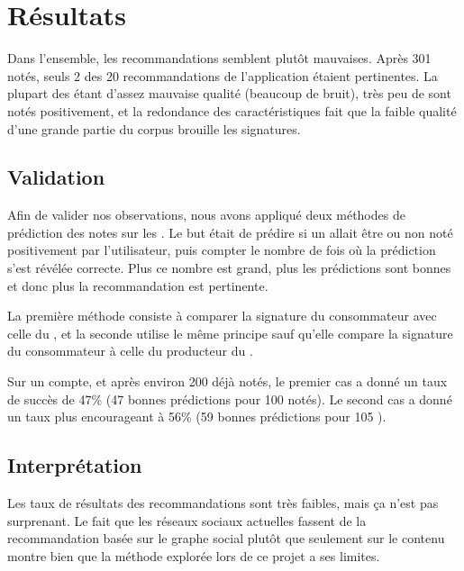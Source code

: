 
\section{Résultats}

Dans l’ensemble, les recommandations semblent plutôt mauvaises. Après 301
\tweets{} notés, seuls 2 des 20 recommandations de l’application étaient
pertinentes. La plupart des \tweets{} étant d’assez mauvaise qualité (beaucoup
de bruit), très peu de \tweets{} sont notés positivement, et la redondance des
caractéristiques fait que la faible qualité d’une grande partie du corpus
brouille les signatures.

\subsection{Validation}

Afin de valider nos observations, nous avons appliqué deux méthodes de
prédiction des notes sur les \tweets{}. Le but était de prédire si un \tweet{}
allait être ou non noté positivement par l’utilisateur, puis compter le nombre
de fois où la prédiction s’est révélée correcte. Plus ce nombre est grand, plus
les prédictions sont bonnes et donc plus la recommandation est pertinente.

La première méthode consiste à comparer la signature du consommateur avec celle
du \tweet{}, et la seconde utilise le même principe sauf qu’elle compare la
signature du consommateur à celle du producteur du \tweet{}.

Sur un compte, et après environ 200 \tweets{} déjà notés, le premier cas a
donné un taux de succès de 47\% (47 bonnes prédictions pour 100 \tweets{}
notés). Le second cas a donné un taux plus encourageant à 56\% (59 bonnes
prédictions pour 105 \tweets{}).

\subsection{Interprétation}

Les taux de résultats des recommandations sont très faibles, mais ça n’est pas
surprenant. Le fait que les réseaux sociaux actuelles fassent de la
recommandation basée sur le graphe social plutôt que seulement sur le contenu
montre bien que la méthode explorée lors de ce projet a ses limites.
